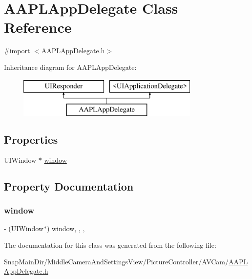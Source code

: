 \hypertarget{interface_a_a_p_l_app_delegate}{}\section{A\+A\+P\+L\+App\+Delegate Class Reference}
\label{interface_a_a_p_l_app_delegate}


{\ttfamily \#import $<$A\+A\+P\+L\+App\+Delegate.\+h$>$}

Inheritance diagram for A\+A\+P\+L\+App\+Delegate\+:\begin{figure}[H]
\begin{center}
\leavevmode
\includegraphics[height=2.000000cm]{interface_a_a_p_l_app_delegate}
\end{center}
\end{figure}
\subsection*{Properties}
\begin{DoxyCompactItemize}
\item 
U\+I\+Window $\ast$ \hyperlink{interface_a_a_p_l_app_delegate_ad632bf79ce19af6436e78b277bd009f3}{window}
\end{DoxyCompactItemize}


\subsection{Property Documentation}
\hypertarget{interface_a_a_p_l_app_delegate_ad632bf79ce19af6436e78b277bd009f3}{}\label{interface_a_a_p_l_app_delegate_ad632bf79ce19af6436e78b277bd009f3} 
\subsubsection{\texorpdfstring{window}{window}}
{\footnotesize\ttfamily -\/ (U\+I\+Window$\ast$) window\hspace{0.3cm}{\ttfamily [read]}, {\ttfamily [write]}, {\ttfamily [nonatomic]}, {\ttfamily [assign]}}



The documentation for this class was generated from the following file\+:\begin{DoxyCompactItemize}
\item 
Snap\+Main\+Dir/\+Middle\+Camera\+And\+Settings\+View/\+Picture\+Controller/\+A\+V\+Cam/\hyperlink{_a_a_p_l_app_delegate_8h}{A\+A\+P\+L\+App\+Delegate.\+h}\end{DoxyCompactItemize}
